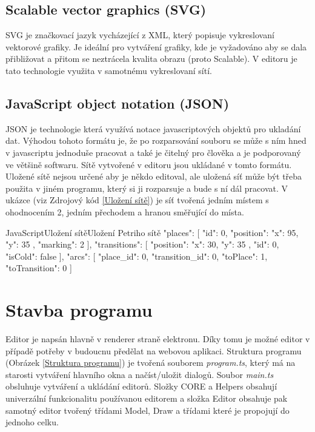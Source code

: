 \documentclass[
  biblatex,
  glossaries,
  printversion
]{kidiplom}
\begin{document}
\subsection{Scalable vector graphics (SVG)}
SVG je značkovací jazyk vycházející z XML, který popisuje vykreslovaní 
vektorové grafiky. Je ideální pro vytváření grafiky, kde je vyžadováno
aby se dala přibližovat a přitom se neztrácela kvalita obrazu (proto Scalable).
V editoru je tato technologie využita v samotnému vykreslovaní sítí.


\subsection{JavaScript object notation (JSON)}
JSON je technologie která využívá notace javascriptových objektů pro ukladání dat.
Výhodou tohoto formátu je, že po rozparsování souboru se může s ním hned v 
javascriptu jednoduše pracovat a také je čitelný pro člověka a je podporovaný ve většině softwaru.
Sítě vytvořené v editoru jsou ukládané v tomto formátu.
Uložené sítě nejsou určené aby je někdo editoval, ale uložená síť může být třeba 
použita v jiném programu, který si ji rozparsuje a bude s ní dál pracovat.
V ukázce (viz Zdrojový kód \ref{Uložení sítě}) je síť tvořená jedním místem s ohodnocením 2, 
jedním přechodem a hranou směřující do místa.
\clearpage

\begin{kicode}{JavaScript}{Uložení sítě}{Uložení Petriho sítě}
{
  "places": [
    {
      "id": 0,
      "position": {
        "x": 95, "y": 35
      },
      "marking": 2
    }
  ],
  "transitions": [
    {
      "position": {
        "x": 30, "y": 35
      },
      "id": 0,
      "isCold": false
    }
  ],
  "arcs": [
    {
      "place_id": 0,
      "transition_id": 0,
      "toPlace": 1,
      "toTransition": 0
    }
  ]
}
\end{kicode}




\section{Stavba programu}

Editor je napsán hlavně v renderer straně elektronu. Díky tomu je možné 
editor v případě potřeby v budoucnu předělat na webovou aplikaci.
Struktura programu (Obrázek \ref{Struktura programu}) je tvořená 
souborem \textit{program.ts}, který má na starosti vytváření hlavního okna 
a načíst/uložit dialogů. Soubor \textit{main.ts} obsluhuje vytváření
a ukládání editorů. Složky CORE a Helpers obsahují univerzální 
funkcionalitu používanou editorem a složka Editor obsahuje pak 
samotný editor tvořený třídami Model, Draw a 
třídami které je propojují do jednoho celku.
\end{document}
